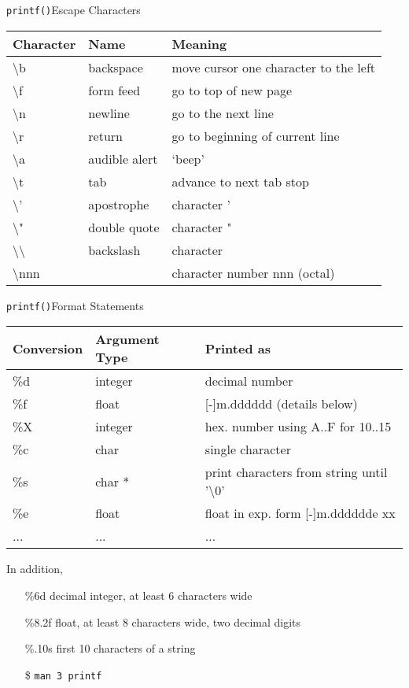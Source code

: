 \begin{frame}{\texttt{printf()}}{Escape Characters}
  \begin{center}
    \begin{tabular}{l|l|l}
      \textbf{Character}   &\textbf{Name} &\textbf{Meaning}\\\hline
      \textbackslash b         &backspace       &move cursor one character to the left\\
      \textbackslash f         &form feed       &go to top of new page\\
      \textbackslash n         &newline         &go to the next line\\
      \textbackslash r         &return          &go to beginning of current line\\
      \textbackslash a         &audible alert   &‘beep’\\
      \textbackslash t         &tab             &advance to next tab stop\\
      \textbackslash ’         &apostrophe      &character ’\\
      \textbackslash "         &double quote    &character "\\
      \textbackslash\textbackslash           &backslash       &character\\
      \textbackslash nnn       &                &character number nnn (octal)\\
    \end{tabular}
  \end{center}
\end{frame}

\begin{frame}{\texttt{printf()}}{Format Statements}
  \begin{center}
    \begin{tabular}{l|l|l}
      Conversion   &Argument Type   &Printed as\\\hline
      \%d          &integer         &decimal number\\
      \%f          &float           &[-]m.dddddd (details below)\\
      \%X          &integer         &hex. number using A..F for 10..15\\
      \%c          &char            &single character\\
      \%s          &char *          &print characters from string until '\textbackslash 0'\\
      \%e          &float           &float in exp. form [-]m.dddddde xx\\
      ...&...&...
    \end{tabular}
  \end{center}
  In addition,
  \begin{itemize}
  \item[\%6d] decimal integer, at least 6 characters wide
  \item[\%8.2f] float, at least 8 characters wide, two decimal digits
  \item[\%.10s] first 10 characters of a string
  \item[\$] \texttt{man 3 printf}
  \end{itemize}
\end{frame}

